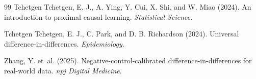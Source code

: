 \documentclass[11pt]{article}
\theoremstyle{definition}
\theoremstyle{plain}
\theoremstyle{remark}
\begin{document}
\begin{thebibliography}{99}
Tchetgen Tchetgen, E. J., A. Ying, Y. Cui, X. Shi, and W. Miao (2024).
An introduction to proximal causal learning.
\textit{Statistical Science}.

Tchetgen Tchetgen, E. J., C. Park, and D. B. Richardson (2024).
Universal difference-in-differences.
\textit{Epidemiology}.

Zhang, Y. et~al. (2025).
Negative-control-calibrated difference-in-differences for real-world data.
\textit{npj Digital Medicine}.
\end{thebibliography}
\end{document}
